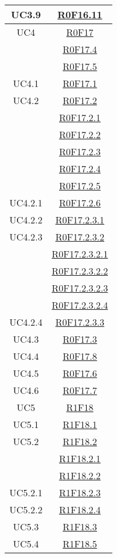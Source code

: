 \documentclass[../AnalisiDeiRequisiti.tex]{subfiles}
\begin{document}
\begin{longtable}{|c|c|}
	UC3.9 & \hyperlink{R0F16.11}{R0F16.11}\\\hline
	UC4 & \hyperlink{R0F17}{R0F17}\\& \hyperlink{R0F17.4}{R0F17.4}\\& \hyperlink{R0F17.5}{R0F17.5}\\\hline
	UC4.1 & \hyperlink{R0F17.1}{R0F17.1}\\\hline
	UC4.2 & \hyperlink{R0F17.2}{R0F17.2}\\& \hyperlink{R0F17.2.1}{R0F17.2.1}\\& \hyperlink{R0F17.2.2}{R0F17.2.2}\\& \hyperlink{R0F17.2.3}{R0F17.2.3}\\& \hyperlink{R0F17.2.4}{R0F17.2.4}\\& \hyperlink{R0F17.2.5}{R0F17.2.5}\\\hline
	UC4.2.1 & \hyperlink{R0F17.2.6}{R0F17.2.6}\\\hline
	UC4.2.2 & \hyperlink{R0F17.2.3.1}{R0F17.2.3.1}\\\hline
	UC4.2.3 & \hyperlink{R0F17.2.3.2}{R0F17.2.3.2}\\& \hyperlink{R0F17.2.3.2.1}{R0F17.2.3.2.1}\\& \hyperlink{R0F17.2.3.2.2}{R0F17.2.3.2.2}\\& \hyperlink{R0F17.2.3.2.3}{R0F17.2.3.2.3}\\& \hyperlink{R0F17.2.3.2.4}{R0F17.2.3.2.4}\\\hline
	UC4.2.4 & \hyperlink{R0F17.2.3.3}{R0F17.2.3.3}\\\hline
	UC4.3 & \hyperlink{R0F17.3}{R0F17.3}\\\hline
	UC4.4 & \hyperlink{R0F17.8}{R0F17.8}\\\hline
	UC4.5 & \hyperlink{R0F17.6}{R0F17.6}\\\hline
	UC4.6 & \hyperlink{R0F17.7}{R0F17.7}\\\hline
	UC5 & \hyperlink{R1F18}{R1F18}\\\hline
	UC5.1 & \hyperlink{R1F18.1}{R1F18.1}\\\hline
	UC5.2 & \hyperlink{R1F18.2}{R1F18.2}\\& \hyperlink{R1F18.2.1}{R1F18.2.1}\\& \hyperlink{R1F18.2.2}{R1F18.2.2}\\\hline
	UC5.2.1 & \hyperlink{R1F18.2.3}{R1F18.2.3}\\\hline
	UC5.2.2 & \hyperlink{R1F18.2.4}{R1F18.2.4}\\\hline
	UC5.3 & \hyperlink{R1F18.3}{R1F18.3}\\\hline
	UC5.4 & \hyperlink{R1F18.5}{R1F18.5}\\\hline

\end{longtable}
\end{document}
